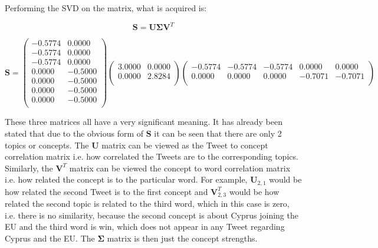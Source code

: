 \documentclass[11pt,a4paper]{article}
\begin{document}
Performing the SVD on the matrix, what is acquired is:

\begin{equation*}
\mathbf{S} = \mathbf{U}\mathbf{\Sigma}\mathbf{V}^T
\end{equation*}

\begin{equation}
\mathbf{S} = \begin{pmatrix}
-0.5774 & 0.0000\\
-0.5774 & 0.0000\\
-0.5774 & 0.0000\\
0.0000 & -0.5000\\
0.0000 & -0.5000\\
0.0000 & -0.5000\\
0.0000 & -0.5000\\
\end{pmatrix}
\begin{pmatrix}
3.0000 & 0.0000\\
0.0000 & 2.8284\\
\end{pmatrix}
\begin{pmatrix}
-0.5774 & -0.5774 & -0.5774 & 0.0000 & 0.0000 \\
0.0000 & 0.0000 & 0.0000 & -0.7071 & -0.7071\\
\end{pmatrix}
\end{equation}

These three matrices all have a very significant meaning. It has already been stated that due to the obvious form of $\mathbf{S}$ it can be seen that there are only 2 topics or concepts. The $\mathbf{U}$ matrix can be viewed as the Tweet to concept correlation matrix i.e. how correlated the Tweets are to the corresponding topics. Similarly, the $\mathbf{V}^T$ matrix can be viewed  the concept to word correlation matrix i.e. how related the concept is to the particular word. For example, $\mathbf{U}_{2,1}$ would be how related the second Tweet is to the first concept and $\mathbf{V}^T_{2,3}$ would be how related the second topic is related to the third word, which in this case is zero, i.e. there is no similarity, because the second concept is about Cyprus joining the EU and the third word is win, which does not appear in any Tweet regarding Cyprus and the EU. The $\mathbf{\Sigma}$ matrix is then just the concept strengths.
\end{document}
